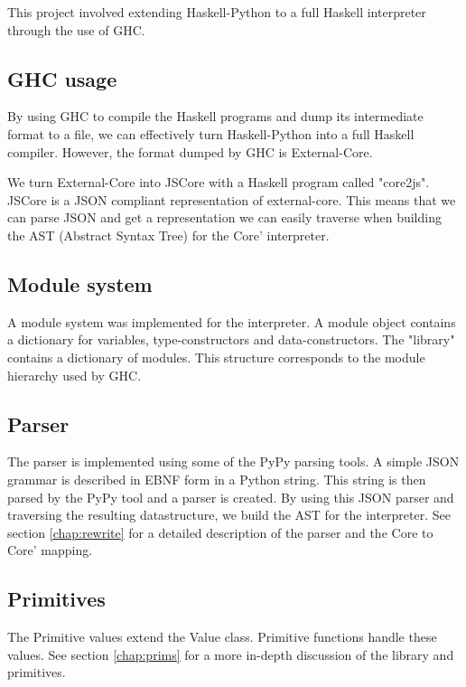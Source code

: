 This project involved extending Haskell-Python to a full Haskell interpreter 
through the use of GHC.

\subsection{GHC usage}


By using GHC to compile the Haskell programs and dump its intermediate
format to a file, we can effectively turn Haskell-Python into a full
Haskell compiler. However, the format dumped by GHC is External-Core.

We turn External-Core into JSCore with a Haskell program called "core2js".
JSCore is a JSON compliant representation of external-core. This means that
we can parse JSON and get a representation we can easily traverse when building
the AST (Abstract Syntax Tree) for the Core' interpreter.

\subsection{Module system}

A module system was implemented for the interpreter. A module object contains
a dictionary for variables, type-constructors and data-constructors. The 
"library" contains a dictionary of modules. This structure corresponds to the
module hierarchy used by GHC.

\subsection{Parser}


The parser is implemented using some of the PyPy parsing tools. A simple 
JSON grammar is described in EBNF form in a Python string. This string
is then parsed by the PyPy tool and a parser is created. By using this JSON
parser and traversing the resulting datastructure, we build the AST for the 
interpreter. See section \ref{chap:rewrite} for a detailed description of 
the parser and the Core to Core' mapping.

\subsection{Primitives}

The Primitive values extend the Value class. Primitive functions handle
these values.
See section \ref{chap:prims} for a more in-depth discussion of the
library and primitives.

